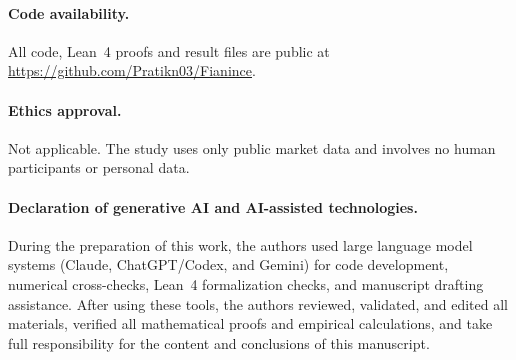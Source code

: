 \documentclass[12pt]{article}
\theoremstyle{definition}
\theoremstyle{remark}
\begin{document}
\paragraph{Code availability.} All code, Lean~4 proofs and result files are public at \url{https://github.com/Pratikn03/Fianince}.

\paragraph{Ethics approval.} Not applicable. The study uses only public market data and involves no human participants or personal data.

\paragraph{Declaration of generative AI and AI-assisted technologies.} During the preparation of this work, the authors used large language model systems (Claude, ChatGPT/Codex, and Gemini) for code development, numerical cross-checks, Lean~4 formalization checks, and manuscript drafting assistance. After using these tools, the authors reviewed, validated, and edited all materials, verified all mathematical proofs and empirical calculations, and take full responsibility for the content and conclusions of this manuscript.
\end{document}
